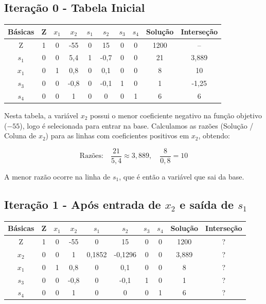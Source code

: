 \documentclass[12pt]{article}
\begin{document}
\subsection*{Iteração 0 - Tabela Inicial}
\begin{center}
\renewcommand{\arraystretch}{1.3}
\begin{tabular}{c|ccccccc|c|c}
\textbf{Básicas} & Z & $x_1$ & $x_2$ & $s_1$ & $s_2$ & $s_3$ & $s_4$ & \textbf{Solução} & \textbf{Interseção} \\
\hline
Z & 1   & 0 & -55 & 0 & 15 & 0 & 0 & 1200 & -- \\
$s_1$ & 0 & 0 & 5{,}4 & 1 & -0{,}7 & 0 & 0 & 21 & 3{,}889 \\
$x_1$ & 0 & 1 & 0{,}8 & 0 & 0{,}1 & 0 & 0 & 8 & 10 \\
$s_3$ & 0 & 0 & -0{,}8 & 0 & -0{,}1 & 1 & 0 & 1 & -1{,}25 \\
$s_4$ & 0 & 0 & 1 & 0 & 0 & 0 & 1 & 6 & 6 \\
\end{tabular}
\end{center}

\noindent
Nesta tabela, a variável $x_2$ possui o menor coeficiente negativo na função objetivo ($-55$), logo é selecionada para entrar na base. Calculamos as razões (Solução / Coluna de $x_2$) para as linhas com coeficientes positivos em $x_2$, obtendo:

\[
\text{Razões:} \quad \frac{21}{5{,}4} \approx 3{,}889, \quad \frac{8}{0{,}8} = 10
\]

A menor razão ocorre na linha de $s_1$, que é então a variável que sai da base.

\subsection*{Iteração 1 - Após entrada de $x_2$ e saída de $s_1$}
\begin{center}
\renewcommand{\arraystretch}{1.3}
\begin{tabular}{c|ccccccc|c|c}
\textbf{Básicas} & Z & $x_1$ & $x_2$ & $s_1$ & $s_2$ & $s_3$ & $s_4$ & \textbf{Solução} & \textbf{Interseção} \\
\hline
Z  & 1 & 0 & -55 & 0 & 15 & 0 & 0 & 1200 & ? \\
$x_2$ & 0 & 0 & 1 & 0{,}1852 & -0{,}1296 & 0 & 0 & 3{,}889 & ? \\
$x_1$ & 0 & 1 & 0{,}8 & 0 & 0{,}1 & 0 & 0 & 8 & ? \\
$s_3$ & 0 & 0 & -0{,}8 & 0 & -0{,}1 & 1 & 0 & 1 & ? \\
$s_4$ & 0 & 0 & 1 & 0 & 0 & 0 & 1 & 6 & ? \\
\end{tabular}
\end{center}
\end{document}
